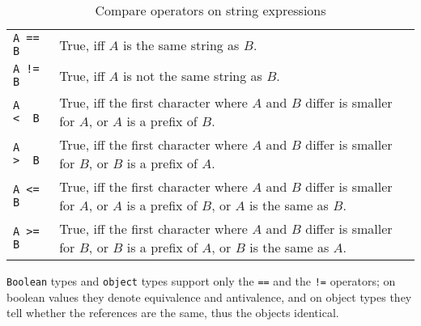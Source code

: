 \begin{table}[htbp]
  \centering
  \begin{tabularx}{\linewidth}{|l|X|} \hline
    \texttt{A == B} & True, iff $A$ is the same string as $B$. \\
    \texttt{A != B} & True, iff $A$ is not the same string as $B$. \\
    \texttt{A <\ \ B} & True, iff the first character where $A$ and $B$ differ is smaller for $A$, or $A$ is a prefix of $B$. \\
    \texttt{A >\ \ B} & True, iff the first character where $A$ and $B$ differ is smaller for $B$, or $B$ is a prefix of $A$. \\
    \texttt{A <= B} & True, iff the first character where $A$ and $B$ differ is smaller for $A$, or $A$ is a prefix of $B$, or $A$ is the same as $B$. \\
    \texttt{A >= B} & True, iff the first character where $A$ and $B$ differ is smaller for $B$, or $B$ is a prefix of $A$, or $B$ is the same as $A$. \\ \hline
  \end{tabularx}
  \caption{Compare operators on string expressions}
  \label{compandstring}
\end{table}

\texttt{Boolean} types and \texttt{object} types support only the \texttt{==} and the \texttt{!=} operators;
on boolean values they denote equivalence and antivalence,
and on object types they tell whether the references are the same, thus the objects identical.


